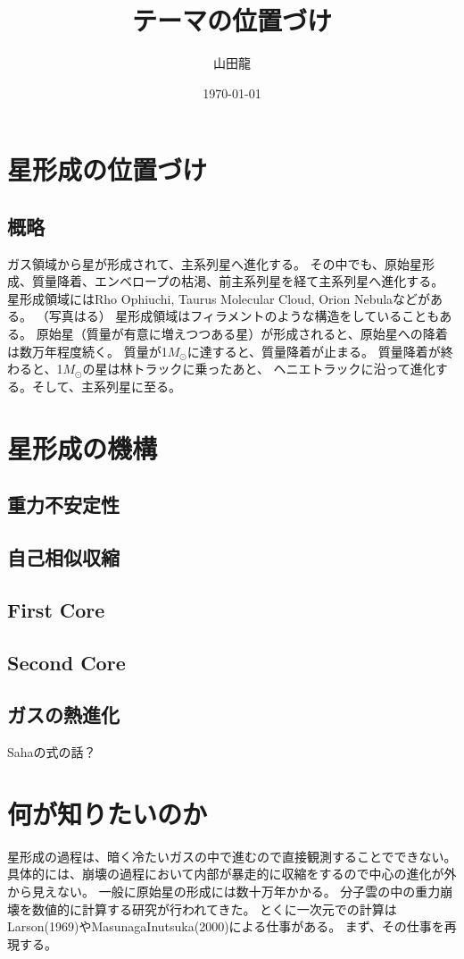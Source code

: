 \documentclass{jsarticle}
\date{\today}
\author{山田龍}
\title{テーマの位置づけ}
\begin{document}
\maketitle
\section{星形成の位置づけ}
\subsection{概略}
ガス領域から星が形成されて、主系列星へ進化する。
その中でも、原始星形成、質量降着、エンベロープの枯渇、前主系列星を経て主系列星へ進化する。
星形成領域にはRho Ophiuchi, Taurus Molecular Cloud, Orion Nebulaなどがある。
（写真はる）
星形成領域はフィラメントのような構造をしていることもある。
原始星（質量が有意に増えつつある星）が形成されると、原始星への降着は数万年程度続く。
質量が1$M_\odot$に達すると、質量降着が止まる。
質量降着が終わると、1$M_\odot$の星は林トラックに乗ったあと、
ヘニエトラックに沿って進化する。そして、主系列星に至る。
\section{星形成の機構}
\subsection{重力不安定性}
\subsection{自己相似収縮}
\subsection{First Core}
\subsection{Second Core}
\subsection{ガスの熱進化}
Sahaの式の話？
\section{何が知りたいのか}
星形成の過程は、暗く冷たいガスの中で進むので直接観測することでできない。
具体的には、崩壊の過程において内部が暴走的に収縮をするので中心の進化が外から見えない。
一般に原始星の形成には数十万年かかる。
分子雲の中の重力崩壊を数値的に計算する研究が行われてきた。
とくに一次元での計算はLarson(1969)やMasunagaInutsuka(2000)による仕事がある。
まず、その仕事を再現する。
\end{document}
